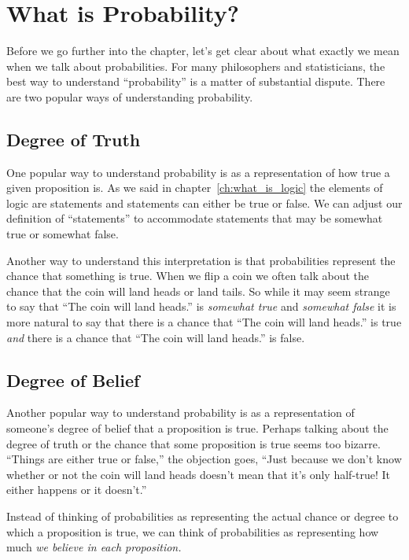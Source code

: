 \section{What is Probability?}\label{sec:whatisprob}

Before we go further into the chapter, let's get clear about what exactly we mean when we talk about probabilities. For many philosophers and statisticians, the best way to understand ``probability'' is a matter of substantial dispute. There are two popular ways of understanding probability.

\subsection{Degree of Truth}

One popular way to understand probability is as a representation of how true a given proposition is. As we said in chapter~\ref{ch:what_is_logic} the elements of logic are statements and statements can either be true or false. We can adjust our definition of ``statements'' to accommodate statements that may be somewhat true or somewhat false.

Another way to understand this interpretation is that probabilities represent the chance that something is true. When we flip a coin we often talk about the chance that the coin will land heads or land tails. So while it may seem strange to say that ``The coin will land heads.'' is \emph{somewhat true} and \emph{somewhat false} it is more natural to say that there is a chance that ``The coin will land heads.'' is true \emph{and} there is a chance that ``The coin will land heads.'' is false.

\subsection{Degree of Belief}

Another popular way to understand probability is as a representation of someone's degree of belief that a proposition is true. Perhaps talking about the degree of truth or the chance that some proposition is true seems too bizarre. ``Things are either true or false,'' the objection goes, ``Just because we don't know whether or not the coin will land heads doesn't mean that it's only half-true! It either happens or it doesn't.''

Instead of thinking of probabilities as representing the actual chance or degree to which a proposition is true, we can think of probabilities as representing how much \emph{we believe in each proposition.}

